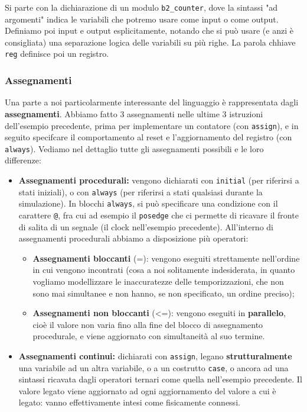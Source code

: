 \documentclass[a4paper,11pt]{article}
\begin{document}
\lstset{language=verilog}

Si parte con la dichiarazione di un modulo \lstinline|b2_counter|, dove la sintassi "ad argomenti" indica le variabili che potremo usare come input o come output.
Definiamo poi input e output esplicitamente, notando che si può usare (e anzi è consigliata) una separazione logica delle variabili su più righe.
La parola chhiave \lstinline|reg| definisce poi un registro.

\subsubsection{Assegnamenti}
Una parte a noi particolarmente interessante del linguaggio è rappresentata dagli \textbf{assegnamenti}.
Abbiamo fatto 3 assegnamenti nelle ultime 3 istruzioni dell'esempio precedente, prima per implementare un contatore (con \lstinline|assign|), e in seguito specifcare il comportamento al reset e l'aggiornamento del registro (con \lstinline|always|).
Vediamo nel dettaglio tutte gli assegnamenti possibili e le loro differenze:
\begin{itemize}
	\item \textbf{Assegnamenti procedurali:} vengono dichiarati con \lstinline|initial| (per riferirsi a stati iniziali), o con \lstinline|always| (per riferirsi a stati qualsiasi durante la simulazione).
	In blocchi \lstinline|always|, si può specificare una condizione con il carattere \lstinline|@|, fra cui ad esempio il \lstinline|posedge| che ci permette di ricavare il fronte di salita di un segnale (il clock nell'esempio precedente).
	All'interno di assegnamenti procedurali abbiamo a disposizione più operatori:
	\begin{itemize}
		\item \textbf{Assegnamenti bloccanti} (=): vengono eseguiti strettamente nell'ordine in cui vengono incontrati (cosa a noi solitamente indesiderata, in quanto vogliamo modellizzare le inaccuratezze delle temporizzazioni, che non sono mai simultanee e non hanno, se non specificato, un ordine preciso);
		\item \textbf{Assegnamenti non bloccanti} (<=): vengono eseguiti in \textbf{parallelo}, cioè il valore non varia fino alla fine del blocco di assegnamento procedurale, e viene aggiornato con simultaneità al suo termine.
	\end{itemize}
\item \textbf{Assegnamenti continui:} dichiarati con \lstinline|assign|, legano \textbf{strutturalmente} una variabile ad un altra variabile, o a un costrutto \lstinline|case|, o ancora ad una sintassi ricavata dagli operatori ternari come quella nell'esempio precedente. Il valore legato viene aggiornato ad ogni aggiornamento del valore a cui è legato: vanno effettivamente intesi come fisicamente connessi.
\end{itemize}
\end{document}
